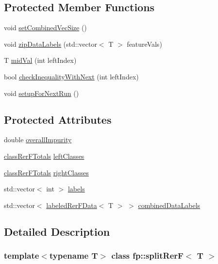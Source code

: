 \subsection*{Protected Member Functions}
\begin{DoxyCompactItemize}
\item 
void \hyperlink{classfp_1_1splitRerF_aa1ccd2bea54313e731cfd85d4026c53c}{set\+Combined\+Vec\+Size} ()
\item 
void \hyperlink{classfp_1_1splitRerF_a46321fe50cebbf12238e4e1be1928e0d}{zip\+Data\+Labels} (std\+::vector$<$ T $>$ feature\+Vals)
\item 
T \hyperlink{classfp_1_1splitRerF_adf7600843befe65e4a8a34a60f2b5edc}{mid\+Val} (int left\+Index)
\item 
bool \hyperlink{classfp_1_1splitRerF_aee3b2a4912c569eeb5c2aea155ab48ab}{check\+Inequality\+With\+Next} (int left\+Index)
\item 
void \hyperlink{classfp_1_1splitRerF_ac7ee17995ee82e98a092089b5803fd70}{setup\+For\+Next\+Run} ()
\end{DoxyCompactItemize}
\subsection*{Protected Attributes}
\begin{DoxyCompactItemize}
\item 
double \hyperlink{classfp_1_1splitRerF_a4b2291a2bf5d4bd6b7d45b0e7037c5cc}{overall\+Impurity}
\item 
\hyperlink{classfp_1_1classRerFTotals}{class\+Rer\+F\+Totals} \hyperlink{classfp_1_1splitRerF_aa5aa4856a4bc8e5f0852d8e6fa935cfc}{left\+Classes}
\item 
\hyperlink{classfp_1_1classRerFTotals}{class\+Rer\+F\+Totals} \hyperlink{classfp_1_1splitRerF_a8f78d6a0269d046328bead1cbf51be36}{right\+Classes}
\item 
std\+::vector$<$ int $>$ \hyperlink{classfp_1_1splitRerF_a85d708ae07bbfae5205111082e4037df}{labels}
\item 
std\+::vector$<$ \hyperlink{classfp_1_1labeledRerFData}{labeled\+Rer\+F\+Data}$<$ T $>$ $>$ \hyperlink{classfp_1_1splitRerF_a2ce4d0a7ae4ba4958ddcc1adba71b2c9}{combined\+Data\+Labels}
\end{DoxyCompactItemize}


\subsection{Detailed Description}
\subsubsection*{template$<$typename T$>$\newline
class fp\+::split\+Rer\+F$<$ T $>$}



